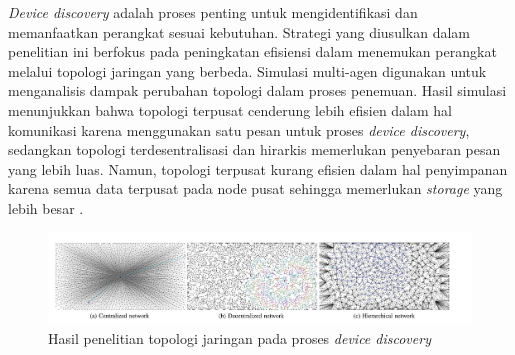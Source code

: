 \textit{Device discovery} adalah proses penting untuk mengidentifikasi dan memanfaatkan perangkat sesuai kebutuhan. Strategi yang diusulkan dalam penelitian ini berfokus pada peningkatan efisiensi dalam menemukan perangkat melalui topologi jaringan yang berbeda. Simulasi multi-agen digunakan untuk menganalisis dampak perubahan topologi dalam proses penemuan. Hasil simulasi menunjukkan bahwa topologi terpusat cenderung lebih efisien dalam hal komunikasi karena menggunakan satu pesan untuk proses \textit{device discovery}, sedangkan topologi terdesentralisasi dan hirarkis memerlukan penyebaran pesan yang lebih luas. Namun, topologi terpusat kurang efisien dalam hal penyimpanan karena semua data terpusat pada node pusat sehingga memerlukan \textit{storage} yang lebih besar \parencite{DeviceDiscovery}.

\begin{figure}[h]
  \centering
  \includegraphics[width=1\textwidth]{resources/chapter-2/penelitian-terkait-device-discovery-strategy.jpg}
  \caption{Hasil penelitian topologi jaringan pada proses \textit{device discovery} \parencite{DeviceDiscovery}}
  \label{fig:stragey-for-device-discovery}
\end{figure}

